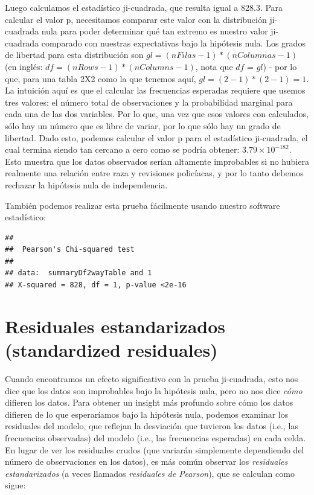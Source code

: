 \documentclass[
  12pt,
]{book}
\begin{document}
Luego calculamos el estadístico ji-cuadrada, que resulta igual a 828.3.
Para calcular el valor p, necesitamos comparar este valor con la distribución ji-cuadrada nula para poder determinar qué tan extremo es nuestro valor ji-cuadrada comparado con nuestras expectativas bajo la hipótesis nula. Los grados de libertad para esta distribución son \(gl = (nFilas - 1) * (nColumnas - 1)\) (en inglés: \(df = (nRows - 1) * (nColumns - 1)\), nota que \(df\) = \(gl\)) - por lo que, para una tabla 2X2 como la que tenemos aquí, \(gl = (2-1)*(2-1)=1\). La intuición aquí es que el calcular las frecuencias esperadas requiere que usemos tres valores: el número total de observaciones y la probabilidad marginal para cada una de las dos variables. Por lo que, una vez que esos valores con calculados, sólo hay un número que es libre de variar, por lo que sólo hay un grado de libertad. Dado esto, podemos calcular el valor p para el estadístico ji-cuadrada, el cual termina siendo tan cercano a cero como se podría obtener: \(3.79 \times 10^{-182}\). Esto muestra que los datos observados serían altamente improbables si no hubiera realmente una relación entre raza y revisiones policíacas, y por lo tanto debemos rechazar la hipótesis nula de independencia.

También podemos realizar esta prueba fácilmente usando nuestro software estadístico:

\begin{verbatim}
## 
##  Pearson's Chi-squared test
## 
## data:  summaryDf2wayTable and 1
## X-squared = 828, df = 1, p-value <2e-16
\end{verbatim}

\hypertarget{residuales-estandarizados-standardized-residuales}{%
\section{Residuales estandarizados (standardized residuales)}\label{residuales-estandarizados-standardized-residuales}}

Cuando encontramos un efecto significativo con la prueba ji-cuadrada, esto nos dice que los datos son improbables bajo la hipótesis nula, pero no nos dice \emph{cómo} difieren los datos. Para obtener un insight más profundo sobre cómo los datos difieren de lo que esperaríamos bajo la hipótesis nula, podemos examinar los residuales del modelo, que reflejan la desviación que tuvieron los datos (i.e., las frecuencias observadas) del modelo (i.e., las frecuencias esperadas) en cada celda. En lugar de ver los residuales crudos (que variarán simplemente dependiendo del número de observaciones en los datos), es más común observar los \emph{residuales estandarizados} (a veces llamados \emph{residuales de Pearson}), que se calculan como sigue:
\end{document}
